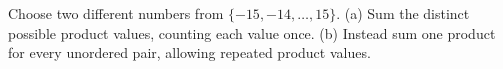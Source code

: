 Choose two different numbers from $\{-15,-14,\ldots,15\}$. (a) Sum the distinct possible product values, counting each value once. (b) Instead sum one product for every unordered pair, allowing repeated product values.
